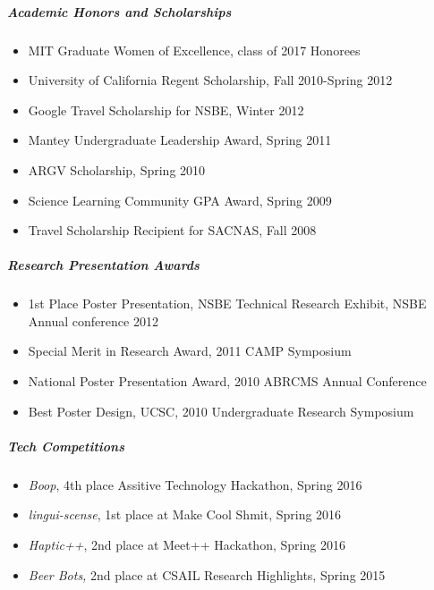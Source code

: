 \documentclass[10pt,letterpaper]{article}
\begin{document}
\subparagraph{Academic Honors and Scholarships}
\begin{itemize}
\item MIT Graduate Women of Excellence, class of 2017 Honorees
\item University of California Regent Scholarship, Fall 2010-Spring 2012 
\item  Google Travel Scholarship for NSBE,  Winter 2012 
\item Mantey Undergraduate Leadership Award,  Spring 2011 
 \item ARGV Scholarship, Spring 2010 
\item  Science Learning Community GPA Award, Spring 2009 
\item Travel Scholarship Recipient for SACNAS, Fall 2008 
\end{itemize}

\subparagraph{Research Presentation Awards}
\begin{itemize}
\item 1st Place Poster Presentation, NSBE Technical Research Exhibit, NSBE Annual conference 2012
\item Special Merit in Research Award,  2011 CAMP Symposium 
\item  National Poster Presentation Award, 2010 ABRCMS Annual Conference
\item Best Poster Design, UCSC, 2010 Undergraduate Research Symposium
\end{itemize}

\subparagraph{Tech Competitions}
\begin{itemize}
\item {\em Boop}, 4th place Assitive Technology Hackathon, Spring 2016
\item {\em lingui-scense}, 1st place at Make Cool Shmit, Spring 2016
\item {\em Haptic++}, 2nd place at Meet++ Hackathon, Spring 2016
\item {\em Beer Bots,} 2nd place at CSAIL Research Highlights, Spring 2015 
\end{itemize}
\end{document}
